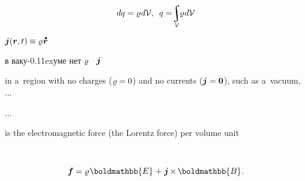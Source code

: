 \nopagebreak\vspace{-0.2em}\begin{equation*}
dq = \chargedensity \hspace{.15ex} d \mathcal{V}
, \hspace{.5em}
q = \hspace{-0.5ex} \scalebox{0.9}{$\displaystyle\integral\displaylimits_{\mathcal{V}}$} \hspace{-0.3ex} \chargedensity \hspace{.15ex} d\mathcal{V}
\end{equation*}

${%
   \currentdensity(\locationvector, t) \hspace{-0.1ex}
   \equiv
   \chargedensity \hspace{.15ex} \mathdotabove{\locationvector} %
}$

\foreignlanguage{russian}{в ваку\kern-0.11exуме нет}
$\varrho$ ~$\bm{j}$

in a~region with no charges (${\varrho = 0}$) and no currents (${\bm{j} = \bm{0}}$), such as a~vacuum, ...

...

 is the electromagnetic force (the Lorentz force) per volume unit

~
\ru{)} 

\nopagebreak\vspace{-0.2em}\en{\vspace{-0.7em}}\begin{equation}\label{ponderomotive.electromagneticforcepervolumeunit}
\bm{f} = \chargedensity \hspace{.16ex} \boldmathbb{E} \hspace{.1ex} + \hspace{.1ex} \currentdensity \hspace{-0.16ex} \times \hspace{-0.2ex} \boldmathbb{B}
\hspace{.1ex} .
\end{equation}

